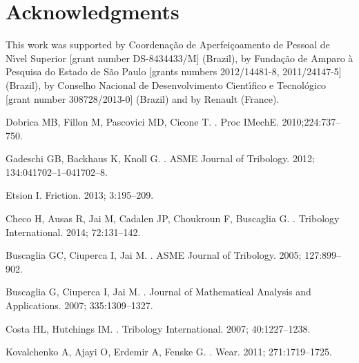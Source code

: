 \section{Acknowledgments}

This work was supported by Coordena\c{c}\~ao de Aperfei\c{c}oamento
de Pessoal de N{\'\i}vel Superior [grant number DS-8434433/M] (Brazil),
by Funda\c{c}\~ao de Amparo \`a Pesquisa do Estado de S\~ao Paulo
[grants numbers 2012/14481-8, 2011/24147-5] (Brazil),
by Conselho Nacional de Desenvolvimento Cient{\'\i}fico e Tecnol\'ogico
[grant number 308728/2013-0] (Brazil) and by Renault (France).



\begin{thebibliography}{10}

Dobrica MB, Fillon M, Pascovici MD, Cicone T.
.
\newblock Proc IMechE. 2010;224:737--750.

Gadeschi GB, Backhaus K, Knoll G.
.
\newblock ASME Journal of Tribology. 2012; 134:041702--1--041702--8.

Etsion I.
\newblock Friction. 2013; 3:195--209.

Checo H, Ausas R, Jai M, Cadalen JP, Choukroun F, Buscaglia G.
.
\newblock Tribology International. 2014; 72:131--142.

Buscaglia GC, Ciuperca I, Jai M.
.
\newblock ASME Journal of Tribology. 2005; 127:899--902.

Buscaglia G, Ciuperca I, Jai M.
.
\newblock Journal of Mathematical Analysis and Applications.
  2007; 335:1309--1327.

Costa HL, Hutchings IM.
.
\newblock Tribology International. 2007; 40:1227--1238.

Kovalchenko A, Ajayi O, Erdemir A, Fenske G.
.
\newblock Wear. 2011; 271:1719--1725.


\end{thebibliography}
